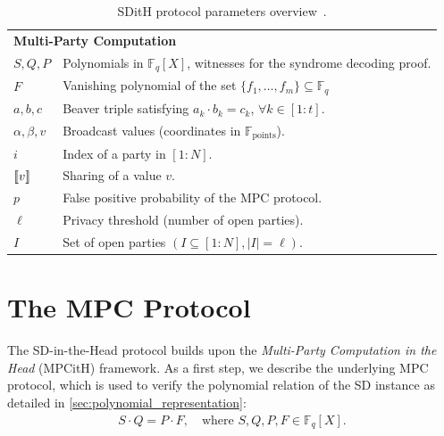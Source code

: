 \documentclass[11pt]{report}
\theoremstyle{definition}
\theoremstyle{plain}
\begin{document}
\begin{table}[]
\begin{tabular}{p{}p{}}
    \multicolumn{2}{l}{\textbf{Multi-Party Computation}}                                                                                  \\
    $S, Q, P$                    & Polynomials in $\mathbb{F}_q[X]$, witnesses for the syndrome decoding proof.                           \\
    $F$                          & Vanishing polynomial of the set $\{f_1, \ldots, f_m\} \subseteq \mathbb{F}_q$                          \\
    $a, b, c$                    & Beaver triple satisfying $a_k \cdot b_k = c_k$, $\forall k \in [1 : t]$.                               \\
    $\alpha, \beta, v$           & Broadcast values (coordinates in $\mathbb{F}_{\text{points}}$).                                        \\
    $i$                          & Index of a party in $[1 : N]$.                                                                         \\
    $\llbracket v \rrbracket$                     & Sharing of a value $v$.                                                                                \\
    $p$                          & False positive probability of the MPC protocol.                                                        \\
    $\ell$                       & Privacy threshold (number of open parties).                                                            \\
    $I$                          & Set of open parties $(I \subseteq [1 : N], |I| = \ell)$.                                               \\
  \end{tabular}
  \caption{SDitH protocol parameters overview~\cite[Table 1]{aguilarsyndrome11}.}\label{tab:sdith-protocol-parameters}
\end{table}

\section{The MPC Protocol}\label{sec:sdith-mpc}

The SD-in-the-Head protocol builds upon the \textit{Multi-Party Computation in the Head} (MPCitH) framework. As a first step, we describe the underlying MPC protocol, which is used to verify the polynomial relation of the SD instance as detailed in \autoref{sec:polynomial_representation}:
\begin{align*}
  S \cdot Q = P \cdot F, \quad \text{where } S, Q, P, F \in \mathbb{F}_q[X].
\end{align*}
\end{document}
